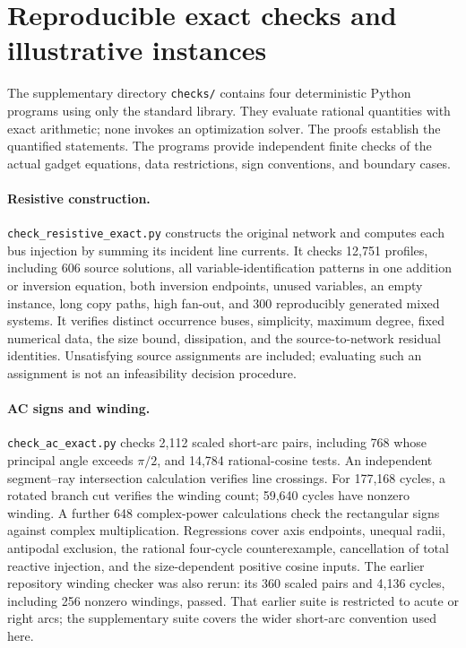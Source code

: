 \section{Reproducible exact checks and illustrative instances}
\label{app:verification}

The supplementary directory \texttt{checks/} contains four deterministic
Python programs using only the standard library. They evaluate rational
quantities with exact arithmetic; none invokes an optimization solver.
The proofs establish the quantified statements. The programs provide
independent finite checks of the actual gadget equations, data restrictions,
sign conventions, and boundary cases.

\paragraph{Resistive construction.}
\texttt{check\_resistive\_exact.py} constructs the original network and
computes each bus injection by summing its incident line currents. It checks
12,751 profiles, including 606 source solutions, all variable-identification
patterns in one addition or inversion equation, both inversion endpoints,
unused variables, an empty instance, long copy paths, high fan-out, and
300 reproducibly generated mixed systems. It verifies distinct occurrence
buses, simplicity, maximum degree, fixed numerical data, the size bound,
dissipation, and the source-to-network residual identities. Unsatisfying
source assignments are included; evaluating such an assignment is not an
infeasibility decision procedure.

\paragraph{AC signs and winding.}
\texttt{check\_ac\_exact.py} checks 2,112 scaled short-arc pairs, including
768 whose principal angle exceeds $\pi/2$, and 14,784 rational-cosine tests.
An independent segment--ray intersection calculation verifies line crossings.
For 177,168 cycles, a rotated branch cut verifies the winding count;
59,640 cycles have nonzero winding. A further 648 complex-power calculations
check the rectangular signs against complex multiplication. Regressions cover
axis endpoints, unequal radii, antipodal exclusion, the rational four-cycle
counterexample, cancellation of total reactive injection, and the
size-dependent positive cosine inputs. The earlier repository winding checker
was also rerun: its 360 scaled pairs and 4,136 cycles, including 256 nonzero
windings, passed. That earlier suite is restricted to acute or right arcs;
the supplementary suite covers the wider short-arc convention used here.

